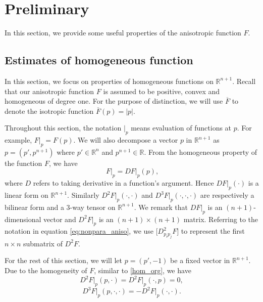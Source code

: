 \documentclass[12pt]{article}
\numberwithin{equation}{section}
\theoremstyle{plain}
\theoremstyle{definition}
\theoremstyle{remark}
\begin{document}
\section{Preliminary} \label{sec:2}
In this section, we provide some useful properties of the anisotropic function $F$.

\subsection{Estimates of homogeneous function} \label{sec:2.1}
In this section, we focus on properties of homogeneous functions on $\mathbb{R}^{n+1}$. 
Recall that our anisotropic function $F$ is assumed to be positive, convex and homogeneous of degree one. For the purpose of distinction, we will use $\overline{F}$ to denote the isotropic function 
$\overline{F}(p) = |p|$.

Throughout this section, the notation $\Big|_{p}$ means evaluation of functions at $p$.
For example, $F\Big|_{p}=F(p)$.
We will also decompose a vector $p$ in $\mathbb{R}^{n+1}$ as $p = (p' , p^{n+1} )$ where
$p'\in\mathbb{R}^n$ and $p^{n+1}\in\mathbb{R}$. From the homogeneous property of the function $F$, we have
\begin{equation} \label{hom_org}
         \ F\Big|_{p} = DF\Big|_{p} (p),
\end{equation}
where $D$ refers to taking derivative in a function's argument. Hence $DF\Big|_{p}(\cdot)$ is a linear form on $\mathbb{R}^{n+1}$. Similarly $D^2 F\Big|_{p}(\cdot,\cdot)$ and $D^3 F\Big|_{p}(\cdot,\cdot,\cdot)$ are respectively a bilinear form and a 3-way tensor on $\mathbb{R}^{n+1}$. We remark that $DF\Big|_{p}$ is an $(n+1)$-dimensional vector and $D^2 F\Big|_{p}$ is an $(n+1)\times(n+1)$ matrix. Referring to the notation in equation \eqref{eq:nonpara_aniso}, we use $\big[D^2_{p_i p_j} F\big]$ to represent the first $n\times n$ submatrix of $D^2F$.

For the rest of this section, we will let $p=(p',-1)$ be a fixed vector in $\mathbb{R}^{n+1}$. Due to the homogeneity of $F$, similar to \eqref{hom_org}, we have
\begin{equation} \label{homc2}
    D^2 F\Big|_p (p,\cdot) = D^2 F\Big|_p (\cdot,p) = 0,
\end{equation}
\begin{equation} \label{homc3}
    D^3 F\Big|_p (p,\cdot,\cdot) = -D^2 F\Big|_p (\cdot,\cdot).
\end{equation}
\end{document}
